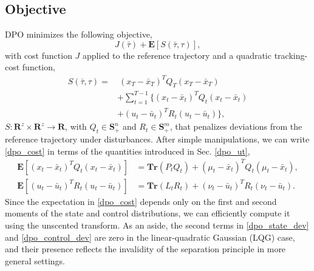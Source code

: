 \subsection{Objective}
DPO minimizes the following objective,
\begin{equation} \label{dpo_cost}
	J(\bar{\tau}) + \mathbf{E} [ S(\bar{\tau}, \tau) ] ,
\end{equation}
with cost function $J$ applied to the reference trajectory and a quadratic tracking-cost function,
\begin{equation}
	\begin{aligned}
		S(\bar{\tau},\tau) =&~(x_T - \bar{x}_T)^T Q_T (x_T - \bar{x}_T) \\ 
		& + \sum \limits_{t=1}^{T-1} \{(x_t - \bar{x}_t)^T Q_t (x_t - \bar{x}_t) \\
		& + (u_t - \bar{u}_t)^T R_t (u_t - \bar{u}_t)\},
		\label{dpo_sample_cost}
	\end{aligned}
\end{equation}
$S : \mathbf{R}^z \times \mathbf{R}^z \rightarrow \mathbf{R}$, with $Q_t \in \mathbf{S}_{+}^n$ and $R_t \in \mathbf{S}_{+}^m$, that penalizes deviations from the reference trajectory under disturbances. After  simple manipulations, we can write \eqref{dpo_cost} in terms of the quantities introduced in Sec. \ref{dpo_ut},
\begin{align}
	\mathbf{E} [ (x_t - \bar{x}_t)^T Q_t (x_t - \bar{x}_t) ] &= \mathbf{Tr}(P_t Q_t) + (\mu_t - \bar{x}_t)^T Q_t (\mu_t - \bar{x}_t),
	\label{dpo_state_dev} \\
	\mathbf{E} [ (u_t - \bar{u}_t)^T R_t (u_t - \bar{u}_t) ] &= \mathbf{Tr}(L_t R_t) + (\nu_t - \bar{u}_t)^T R_t (\nu_t - \bar{u}_t).
	\label{dpo_control_dev}
\end{align}
Since the expectation in \eqref{dpo_cost} depends only on the first and second moments of the state and control distributions, we can efficiently compute it using the unscented transform. As an aside, the second terms in \eqref{dpo_state_dev} and \eqref{dpo_control_dev} are zero in the linear-quadratic Gaussian (LQG) case, and their presence reflects the invalidity of the separation principle in more general settings.

